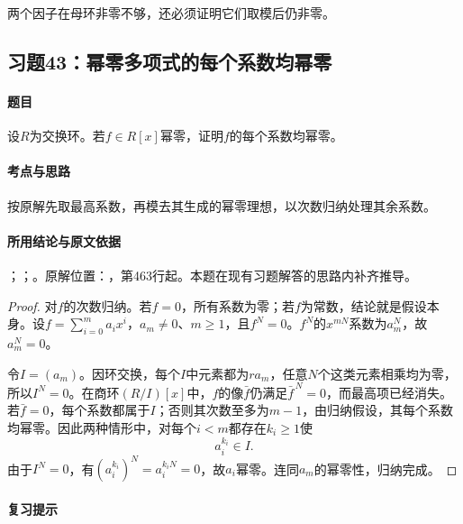 两个因子在母环非零不够，还必须证明它们取模后仍非零。



\subsection{习题43：幂零多项式的每个系数均幂零}

\label{ex:3:43}

\paragraph{题目}

设$R$为交换环。若$f\in R[x]$幂零，证明$f$的每个系数均幂零。

\paragraph{考点与思路}

按原解先取最高系数，再模去其生成的幂零理想，以次数归纳处理其余系数。

\paragraph{所用结论与原文依据}

；；。原解位置：，第463行起。本题在现有习题解答的思路内补齐推导。


\begin{proof}

对$f$的次数归纳。若$f=0$，所有系数为零；若$f$为常数，结论就是假设本身。设$f=\sum_{i=0}^m a_ix^i$，$a_m\ne0$、$m\ge1$，且$f^N=0$。$f^N$的$x^{mN}$系数为$a_m^N$，故$a_m^N=0$。

令$I=(a_m)$。因环交换，每个$I$中元素都为$ra_m$，任意$N$个这类元素相乘均为零，所以$I^N=0$。在商环$(R/I)[x]$中，$f$的像$\bar f$仍满足$\bar f^{\,N}=0$，而最高项已经消失。若$\bar f=0$，每个系数都属于$I$；否则其次数至多为$m-1$，由归纳假设，其每个系数均幂零。因此两种情形中，对每个$i<m$都存在$k_i\ge1$使
\[
a_i^{k_i}\in I.
\]
由于$I^N=0$，有$(a_i^{k_i})^N=a_i^{k_iN}=0$，故$a_i$幂零。连同$a_m$的幂零性，归纳完成。

\end{proof}

\paragraph{复习提示}

